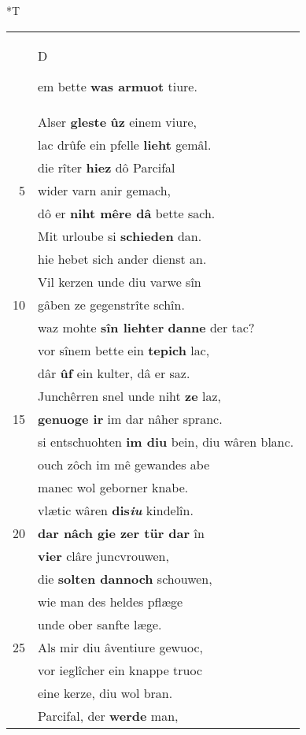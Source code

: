 \documentclass[8pt,a4paper,notitlepage]{article}
\begin{document}
\begin{table}[ht]
\begin{minipage}[t]{0.5\linewidth}
\small
\begin{center}*T
\end{center}
\begin{tabular}{rl}
 & \begin{large}D\end{large}em bette \textbf{was armuot} tiure.\\ 
 & Alser \textbf{gleste} \textbf{ûz} einem viure,\\ 
 & lac drûfe ein pfelle \textbf{lieht} gemâl.\\ 
 & die rîter \textbf{hiez} dô Parcifal\\ 
5 & wider varn anir gemach,\\ 
 & dô er \textbf{niht mêre dâ} bette sach.\\ 
 & Mit urloube si \textbf{schieden} dan.\\ 
 & hie hebet sich ander dienst an.\\ 
 & Vil kerzen unde diu varwe sîn\\ 
10 & gâben ze gegenstrîte schîn.\\ 
 & waz mohte \textbf{sîn liehter} \textbf{danne} der tac?\\ 
 & vor sînem bette ein \textbf{tepich} lac,\\ 
 & dâr \textbf{ûf} ein kulter, dâ er saz.\\ 
 & Junchêrren snel unde niht \textbf{ze} laz,\\ 
15 & \textbf{genuoge ir} im dar nâher spranc.\\ 
 & si entschuohten \textbf{im diu} bein, diu wâren blanc.\\ 
 & ouch zôch im mê gewandes abe\\ 
 & manec wol geborner knabe.\\ 
 & vlætic wâren \textbf{dis\textit{iu}} kindelîn.\\ 
20 & \textbf{dar nâch gie zer tür dar} în\\ 
 & \textbf{vier} clâre juncvrouwen,\\ 
 & die \textbf{solten dannoch} schouwen,\\ 
 & wie man des heldes pflæge\\ 
 & unde ober sanfte læge.\\ 
25 & Als mir diu âventiure gewuoc,\\ 
 & vor ieglîcher ein knappe truoc\\ 
 & eine kerze, diu wol bran.\\ 
 & Parcifal, der \textbf{werde} man,\\ 

\end{tabular}
\end{minipage}
\end{table}
\end{document}
